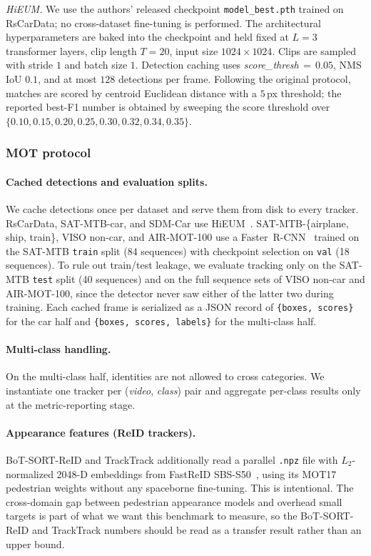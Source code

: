 \documentclass{article}
\newcommand{\minihead}[1]{\noindent\textit{#1.}}
\begin{document}
\minihead{HiEUM}
We use the authors' released checkpoint \texttt{model\_best.pth} trained on RsCarData; no cross-dataset fine-tuning is performed.
The architectural hyperparameters are baked into the checkpoint and held fixed at $L{=}3$ transformer layers, clip length $T{=}20$, input size $1024{\times}1024$.
Clips are sampled with stride $1$ and batch size $1$.
Detection caching uses \emph{score\_thresh}$\,{=}\,0.05$, NMS IoU $0.1$, and at most $128$ detections per frame.
Following the original protocol, matches are scored by centroid Euclidean distance with a $5$\,px threshold;
the reported best-F1 number is obtained by sweeping the score threshold over $\{0.10, 0.15, 0.20, 0.25, 0.30, 0.32, 0.34, 0.35\}$.

\subsubsection{MOT protocol}
\label{appendix:mot-tbd}

\paragraph{Cached detections and evaluation splits.}
We cache detections once per dataset and serve them from disk to
every tracker. RsCarData, SAT-MTB-car, and SDM-Car use
HiEUM~\citep{Xiao2024HiEUM}. SAT-MTB-\{airplane, ship, train\}, VISO
non-car, and AIR-MOT-100 use a Faster~R-CNN~\citep{ren2015fasterrcnn}
trained on the SAT-MTB \texttt{train} split (84 sequences) with
checkpoint selection on \texttt{val} (18 sequences). To rule out
train/test leakage, we evaluate tracking only on the SAT-MTB
\texttt{test} split (40 sequences) and on the full sequence sets
of VISO non-car and AIR-MOT-100, since the detector never saw
either of the latter two during training. Each cached frame is
serialized as a JSON record of \texttt{\{boxes, scores\}} for the
car half and \texttt{\{boxes, scores, labels\}} for the multi-class
half.

\paragraph{Multi-class handling.}
On the multi-class half, identities are not allowed to cross
categories. We instantiate one tracker per
(\emph{video}, \emph{class}) pair and aggregate per-class results
only at the metric-reporting stage.

\paragraph{Appearance features (ReID trackers).}
BoT-SORT-ReID and TrackTrack additionally read a parallel
\texttt{.npz} file with $L_2$-normalized 2048-D embeddings from
FastReID SBS-S50~\citep{he2023fastreid}, using its MOT17 pedestrian
weights without any spaceborne fine-tuning. This is intentional.
The cross-domain gap between pedestrian appearance models and
overhead small targets is part of what we want this benchmark to
measure, so the BoT-SORT-ReID and TrackTrack numbers should be read
as a transfer result rather than an upper bound.
\end{document}
